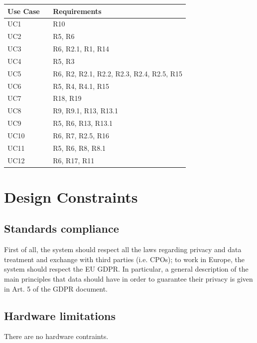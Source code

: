 \begin{center}
    \begin{longtable}{l p{0.75\linewidth}}
        \hline
            \textbf{Use Case} & \textbf{Requirements}\\
        \hline
            UC1 & R10\\
        \hline
            UC2 & R5, R6\\
        \hline
            UC3 & R6, R2.1, R1, R14\\
        \hline
            UC4 & R5, R3\\
        \hline
            UC5 & R6, R2, R2.1, R2.2, R2.3, R2.4, R2.5, R15\\
        \hline
            UC6 & R5, R4, R4.1, R15\\
        \hline
            UC7 & R18, R19\\
        \hline
            UC8 & R9, R9.1, R13, R13.1\\
        \hline
            UC9 & R5, R6, R13, R13.1\\
        \hline
            UC10 & R6, R7, R2.5, R16\\
        \hline
            UC11 & R5, R6, R8, R8.1\\
        \hline
            UC12 & R6, R17, R11\\
        \hline
        
    \end{longtable}
\end{center}

\section{Design Constraints}
\subsection{Standards compliance}
First of all, the system should respect all the laws regarding privacy and data treatment and exchange with third parties (i.e. CPOs); to work in Europe, the system should respect the EU GDPR. In particular, a general description of the main principles that data should have in order to guarantee their privacy is given in Art. 5 of the GDPR document.

\subsection{Hardware limitations}
There are no hardware contraints.

